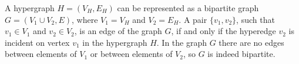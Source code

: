 A hypergraph $H=(V_H,E_H)$ can be represented as a bipartite graph $G=(V_1\cup V_2,E)$, where $V_1=V_H$ and $V_2=E_H$.
A pair $\{v_1,v_2\}$, such that $v_1\in V_1$ and $v_2\in V_2$, is an edge of the graph $G$, if and only if the hyperedge $v_2$ is incident on vertex $v_1$ in the hypergraph $H$.
In the graph $G$ there are no edges between elements of $V_1$ or between elements of $V_2$, so $G$ is indeed bipartite.
